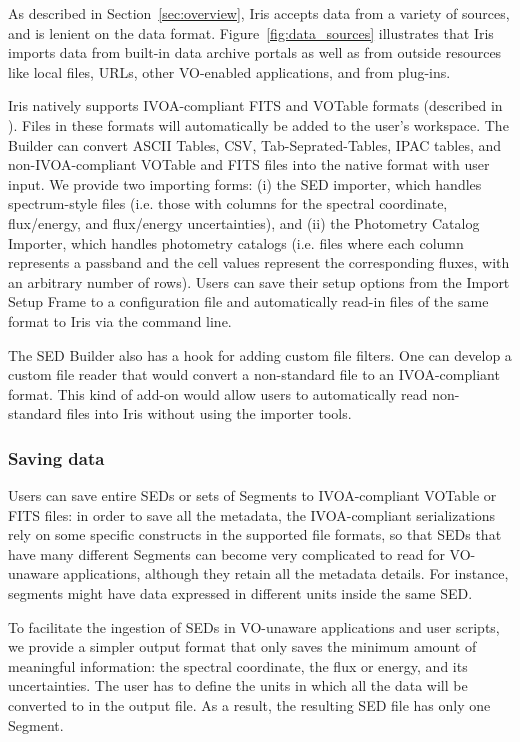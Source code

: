 \documentclass[final,5p]{elsarticle}
\begin{document}
As described in Section~\ref{sec:overview}, Iris accepts data from a variety of sources, and is lenient on the data format. Figure~\ref{fig:data_sources} illustrates that Iris imports data from built-in data archive portals as well as from outside resources like local files, URLs, other VO-enabled applications, and from plug-ins.

Iris natively supports IVOA-compliant FITS and VOTable formats (described in \citet{2012arXiv1204.3055M}). Files in these formats will automatically be added to the user's workspace. The Builder can convert ASCII Tables, CSV, Tab-Seprated-Tables, IPAC tables, and non-IVOA-compliant VOTable and FITS files into the native format with user input. We provide two importing forms: (i) the SED importer, which handles spectrum-style files (i.e. those with columns for the spectral coordinate, flux/energy, and flux/energy uncertainties), and (ii) the Photometry Catalog Importer, which handles photometry catalogs (i.e. files where each column represents a passband and the cell values represent the corresponding fluxes, with an arbitrary number of rows). Users can save their setup options from the Import Setup Frame to a configuration file and automatically read-in files of the same format to Iris via the command line.

The SED Builder also has a hook for adding custom file filters. One can develop a custom file reader that would convert a non-standard file to an IVOA-compliant format. This kind of add-on would allow users to automatically read non-standard files into Iris without using the importer tools.

\subsubsection{Saving data}
Users can save entire SEDs or sets of Segments to IVOA-compliant VOTable or FITS files: in order to save all the metadata, the IVOA-compliant serializations rely on some specific constructs in the supported file formats, so that SEDs that have many different Segments can become very complicated to read for VO-unaware applications, although they retain all the metadata details. For instance, segments might have data expressed in different units inside the same SED.

To facilitate the ingestion of SEDs in VO-unaware applications and user scripts, we provide a simpler output format that only saves the minimum amount of meaningful information: the spectral coordinate, the flux or energy, and its uncertainties. The user has to define the units in which all the data will be converted to in the output file. As a result, the resulting SED file has only one Segment.
\end{document}
